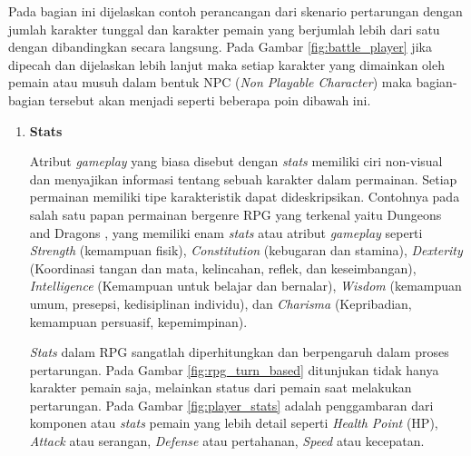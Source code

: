 Pada bagian ini dijelaskan contoh perancangan dari skenario pertarungan dengan jumlah karakter tunggal dan karakter pemain yang berjumlah lebih dari satu dengan dibandingkan secara langsung. Pada Gambar \ref{fig:battle_player} jika dipecah dan dijelaskan lebih lanjut maka setiap karakter yang dimainkan oleh pemain atau musuh dalam bentuk NPC (\textit{Non Playable Character}) maka bagian-bagian tersebut akan menjadi seperti beberapa poin dibawah ini.
\vspace{1ex}

\begin{enumerate}[label=\textbf{\arabic*).}]
	
	\item \textbf{Stats}
	\setlength{\parindent}{0.8cm}
	
	Atribut \textit{gameplay} yang biasa disebut dengan \textit{stats} memiliki ciri non-visual dan menyajikan informasi tentang sebuah karakter dalam permainan. Setiap permainan memiliki tipe karakteristik dapat dideskripsikan. Contohnya pada salah satu papan permainan bergenre RPG yang terkenal yaitu Dungeons and Dragons \citep{heinsoo2008}, yang memiliki enam \textit{stats} atau atribut \textit{gameplay} seperti \textit{Strength} (kemampuan fisik), \textit{Constitution} (kebugaran dan stamina), \textit{Dexterity} (Koordinasi tangan dan mata, kelincahan, reflek, dan keseimbangan), \textit{Intelligence} (Kemampuan untuk belajar dan bernalar), \textit{Wisdom} (kemampuan umum, presepsi, kedisiplinan individu), dan \textit{Charisma} (Kepribadian, kemampuan persuasif, kepemimpinan).
	\vspace{1ex}
	
	\textit{Stats} dalam RPG sangatlah diperhitungkan dan berpengaruh dalam proses pertarungan. Pada Gambar \ref{fig:rpg_turn_based} ditunjukan tidak hanya karakter pemain saja, melainkan status dari pemain saat melakukan pertarungan. Pada Gambar \ref{fig:player_stats} adalah penggambaran dari komponen atau \textit{stats} pemain yang lebih detail seperti \textit{Health Point} (HP), \textit{Attack} atau serangan, \textit{Defense} atau pertahanan, \textit{Speed} atau kecepatan.
	\vspace{1ex}
	

\end{enumerate}
